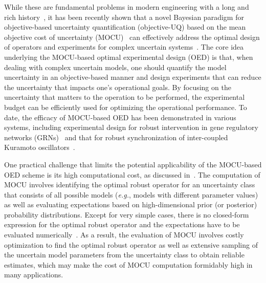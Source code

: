 \documentclass{article}
\begin{document}
While these are fundamental problems in modern engineering with a long and rich history~\cite{Dougherty2017,Dougherty2019}, it has been recently shown that a novel Bayesian paradigm for objective-based uncertainty quantification (objective-UQ) based on the mean objective cost of uncertainty (MOCU)~\cite{Yoon2013tsp,Yoon2021multiMOCU} can effectively address the optimal design of operators and experiments for complex uncertain systems~\cite{Hong2021, Zhao2020, Dehghannasiri15bmc, Dehghannasiri15tcbb, Broumand2015pr}. The core idea underlying the MOCU-based optimal experimental design (OED) is that, when dealing with complex uncertain models, one should quantify the model uncertainty in an objective-based manner and design experiments that can reduce the uncertainty that impacts one's operational goals. By focusing on the uncertainty that matters to the operation to be performed, the experimental budget can be efficiently used for optimizing the operational performance.
To date, the efficacy of MOCU-based OED has been demonstrated in various systems, including experimental design for robust intervention in gene regulatory networks (GRNs)~\cite{Dehghannasiri15bmc,Dehghannasiri15tcbb} and that for robust synchronization of inter-coupled Kuramoto oscillators~\cite{Hong2021}.

One practical challenge that limits the potential applicability of the MOCU-based OED scheme is its high computational cost, as discussed in~\cite{Hong2021,Dehghannasiri15bmc}. The computation of MOCU involves identifying the optimal robust operator for an uncertainty class that consists of all possible models (\textit{e.g.}, models with different parameter values) as well as evaluating expectations based on high-dimensional prior (or posterior) probability distributions. Except for very simple cases, there is no closed-form expression for the optimal robust operator and the expectations have to be evaluated numerically~\cite{Hong2021}. As a result, the evaluation of MOCU involves costly optimization to find the optimal robust operator as well as extensive sampling of the uncertain model parameters from the uncertainty class to obtain reliable estimates, which may make the cost of MOCU computation formidably high in many applications.
\end{document}
